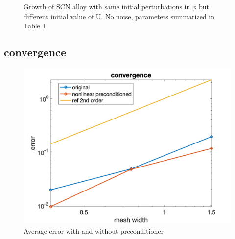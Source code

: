\documentclass[a4paper,12pt]{article}
\begin{document}
 \begin{figure}[!ht]
     \hfill
      \hfill
      \hfill
          
     
     \caption{Growth of SCN alloy with same initial perturbations in $\phi$ but different initial value of U. No noise, parameters summarized in Table 1.}
     \label{fig:Ech}
   \end{figure}

\subsection{convergence}
\begin{figure}[h]
\centering
\includegraphics[width=0.5\linewidth]{./figures/preconditioner.png}
\caption{Average error with and without preconditioner}
\end{figure}
   
\end{document}
